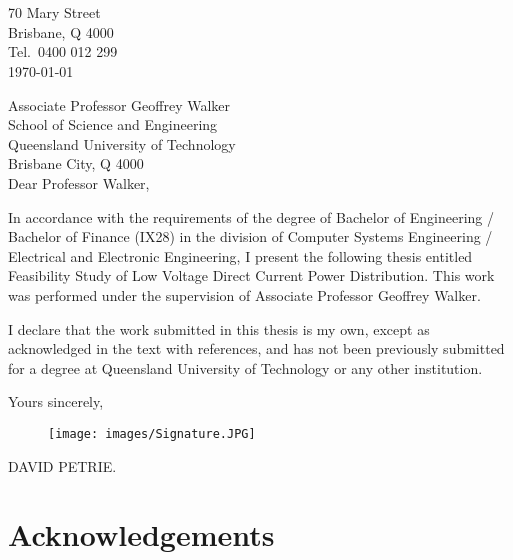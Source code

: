\newpage


\section*{}

\begin{flushright}
	70 Mary Street\\
	Brisbane, Q 4000\\
	Tel.\ 0400 012 299\\
	\medskip
	\today
\end{flushright}
\begin{flushleft}
  Associate Professor Geoffrey Walker\\
  School of Science and Engineering\\
  Queensland University of Technology\\
  Brisbane City, Q 4000\\
  \bigskip\bigskip
  Dear Professor Walker,
\end{flushleft}

In accordance with the requirements of the degree of Bachelor of
Engineering / Bachelor of Finance (IX28) in the division of Computer Systems
Engineering / Electrical and Electronic Engineering, I present the
following thesis entitled Feasibility Study of Low Voltage Direct Current Power Distribution.  This work was performed under the supervision of Associate Professor Geoffrey Walker.

I declare that the work submitted in this thesis is my own, except as
acknowledged in the text with references, and has not been previously
submitted for a degree at Queensland University of Technology or any other
institution.

\begin{flushright}
	Yours sincerely,\\
	\medskip
	\begin{figure}[H]
	\hfill\texttt{[image: images/Signature.JPG]}%
	\end{figure} 
	\medskip
	DAVID PETRIE.
\end{flushright}

\newpage

\section*{Acknowledgements}


